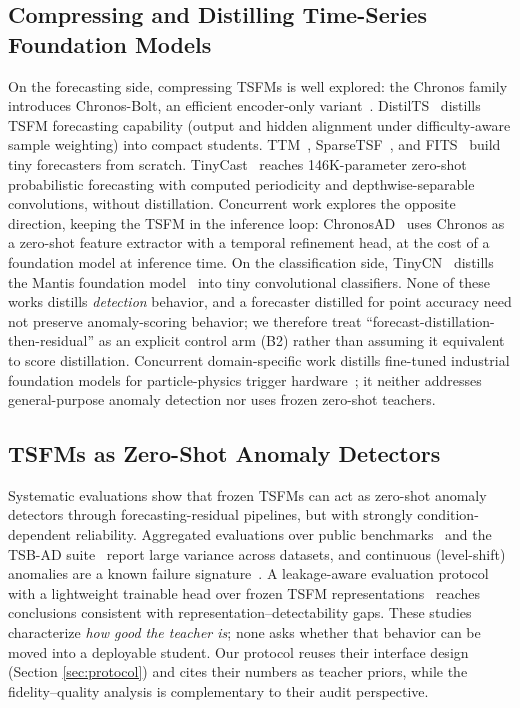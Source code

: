 \subsection{Compressing and Distilling Time-Series Foundation Models}
On the forecasting side, compressing TSFMs is well explored:
the Chronos family introduces Chronos-Bolt, an efficient
encoder-only variant~\cite{ansari2024chronos}. DistilTS~\cite{distilts2026} distills TSFM forecasting
capability (output and hidden alignment under difficulty-aware sample
weighting) into compact students. TTM~\cite{ekambaram2023ttm},
SparseTSF~\cite{hui2024sparsetsf}, and FITS~\cite{xu2024fits} build tiny
forecasters from scratch. TinyCast~\cite{tinycast2026} reaches 146K-parameter
zero-shot probabilistic forecasting with computed periodicity and
depthwise-separable convolutions, without distillation.
Concurrent work explores the opposite direction, keeping the TSFM in
the inference loop: ChronosAD~\cite{chronosad2026} uses Chronos as a
zero-shot feature extractor with a temporal refinement head, at the
cost of a foundation model at inference time. On the
classification side, TinyCN~\cite{tinycn2026} distills the Mantis
foundation model~\cite{mantis2025} into tiny convolutional classifiers. None
of these works distills \emph{detection} behavior, and a forecaster distilled
for point accuracy need not preserve anomaly-scoring behavior; we therefore
treat ``forecast-distillation-then-residual'' as an explicit control arm
(B2) rather than assuming it equivalent to score distillation. Concurrent
domain-specific work distills fine-tuned industrial foundation models for
particle-physics trigger hardware~\cite{ancone2026daq}; it neither addresses
general-purpose anomaly detection nor uses frozen zero-shot teachers.

\subsection{TSFMs as Zero-Shot Anomaly Detectors}
Systematic evaluations show that frozen TSFMs can act as zero-shot anomaly
detectors through forecasting-residual pipelines, but with strongly
condition-dependent reliability. Aggregated evaluations over public
benchmarks~\cite{tsfmad2024eval} and the TSB-AD suite~\cite{tsbad2024} report
large variance across datasets, and continuous (level-shift) anomalies are a
known failure signature~\cite{uray2026}. A leakage-aware evaluation protocol
with a lightweight trainable head over frozen TSFM
representations~\cite{clra2026} reaches conclusions consistent with
representation--detectability gaps. These studies characterize \emph{how good
the teacher is}; none asks whether that behavior can be moved into a
deployable student. Our protocol reuses their interface design (Section
\ref{sec:protocol}) and cites their numbers as teacher priors, while the
fidelity--quality analysis is complementary to their audit perspective.

